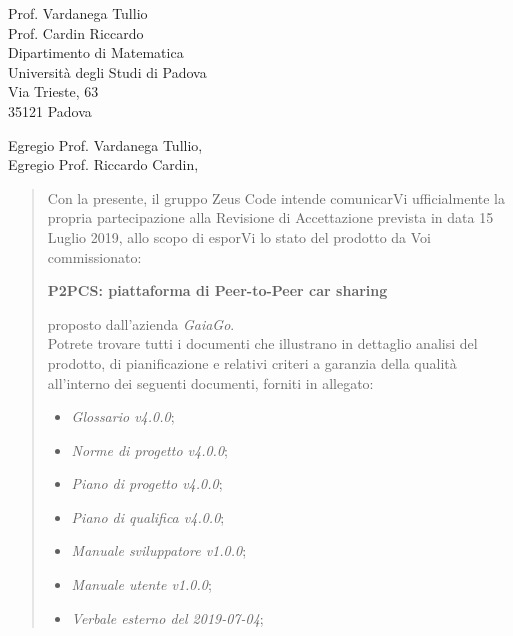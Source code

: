 \begin{letter}{
		Prof. Vardanega Tullio \\
		Prof. Cardin Riccardo \\
		Dipartimento di Matematica \\
		Università degli Studi di Padova \\
		Via Trieste, 63 \\
		35121 Padova}
		
\opening{Egregio Prof. Vardanega Tullio,\\Egregio Prof. Riccardo Cardin,}

\begin{quotation}
Con la presente, il gruppo Zeus Code intende comunicarVi ufficialmente la propria partecipazione alla Revisione di Accettazione prevista in data 15 Luglio 2019, allo scopo di esporVi lo stato del prodotto
da Voi commissionato:

\begin{center}
	\textbf{P2PCS: piattaforma di Peer-to-Peer car sharing}
\end{center}

\noindent proposto dall'azienda \textit{GaiaGo}.\\
Potrete trovare tutti i documenti che illustrano in dettaglio analisi del prodotto, di pianificazione e relativi criteri a garanzia della qualità all'interno dei seguenti 
documenti, forniti in allegato:

\bigskip

\begin{itemize}
	
	\item \textit{Glossario v4.0.0};
	
	\item \textit{Norme di progetto v4.0.0};

	\item \textit{Piano di progetto v4.0.0};

	\item \textit{Piano di qualifica v4.0.0};
	
	\item \textit{Manuale sviluppatore v1.0.0};
	
	\item \textit{Manuale utente v1.0.0};


	\item \textit{Verbale esterno del 2019-07-04};
	

\end{itemize}
\end{quotation}
\end{letter}
